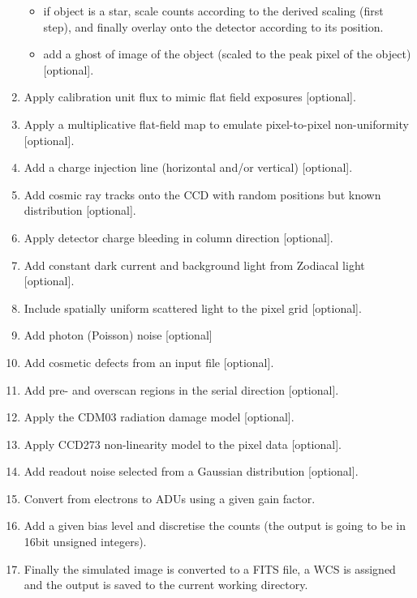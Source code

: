 \documentclass[a4paper,11pt,english]{sphinxmanual}
\begin{document}
\begin{enumerate}
\begin{itemize}
\item {} 
if object is a star, scale counts according to the derived
scaling (first step), and finally overlay onto the detector according to its position.

\item {} 
add a ghost of image of the object (scaled to the peak pixel of the object) {[}optional{]}.

\end{itemize}

\item {} 
Apply calibration unit flux to mimic flat field exposures {[}optional{]}.

\item {} 
Apply a multiplicative flat-field map to emulate pixel-to-pixel non-uniformity {[}optional{]}.

\item {} 
Add a charge injection line (horizontal and/or vertical) {[}optional{]}.

\item {} 
Add cosmic ray tracks onto the CCD with random positions but known distribution {[}optional{]}.

\item {} 
Apply detector charge bleeding in column direction {[}optional{]}.

\item {} 
Add constant dark current and background light from Zodiacal light {[}optional{]}.

\item {} 
Include spatially uniform scattered light to the pixel grid {[}optional{]}.

\item {} 
Add photon (Poisson) noise {[}optional{]}

\item {} 
Add cosmetic defects from an input file {[}optional{]}.

\item {} 
Add pre- and overscan regions in the serial direction {[}optional{]}.

\item {} 
Apply the CDM03 radiation damage model {[}optional{]}.

\item {} 
Apply CCD273 non-linearity model to the pixel data {[}optional{]}.

\item {} 
Add readout noise selected from a Gaussian distribution {[}optional{]}.

\item {} 
Convert from electrons to ADUs using a given gain factor.

\item {} 
Add a given bias level and discretise the counts (the output is going to be in 16bit unsigned integers).

\item {} 
Finally the simulated image is converted to a FITS file, a WCS is assigned
and the output is saved to the current working directory.

\end{enumerate}
\end{document}
